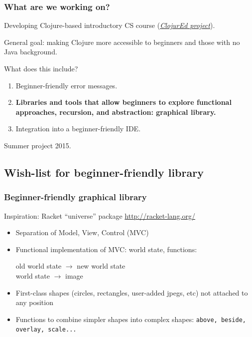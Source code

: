 \documentclass{beamer}
\begin{document}
\begin{frame}
\frametitle{What are we working on?}
Developing Clojure-based introductory CS course ({\it \href{http://cda.morris.umn.edu/~elenam/\#clojure}{ClojurEd project}}). 

General goal: making Clojure more accessible to beginners and those with no Java background. 

What does this include? 
\begin{enumerate}
\item Beginner-friendly error messages. 
\item {\bf Libraries and tools that allow beginners to explore functional approaches, recursion, and abstraction: graphical library.}
\item Integration into a beginner-friendly IDE. 
\end{enumerate}
Summer project 2015. 
\end{frame}

\subsection{Wish-list for beginner-friendly library}

\begin{frame}
\frametitle{Beginner-friendly graphical library}
Inspiration: Racket ``universe'' package \href{http://racket-lang.org/}{http://racket-lang.org/}
\begin{itemize}
\item Separation of Model, View, Control (MVC) 
\item Functional implementation of MVC: world state, functions: 

\noindent
old world state $\rightarrow$ new world state \\
world state $\rightarrow$ image 
\item  First-class shapes (circles, rectangles, user-added jpegs, etc) not attached to any position
\item Functions to combine simpler shapes into complex shapes: {\tt above, beside, overlay, scale...}
\end{itemize}
\end{frame}
\end{document}
